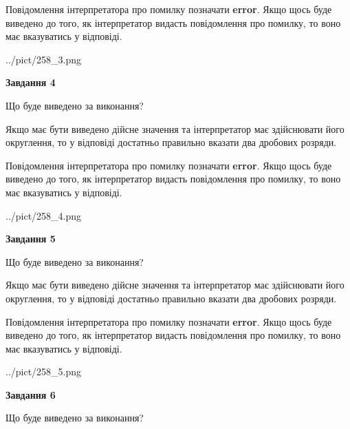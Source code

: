 \documentclass[12pt, ukrainian]{article}
\begin{document}
{\begin {Large}
Повідомлення інтерпретатора про помилку позначати \textbf{error}.
Якщо щось буде виведено до того, як інтерпретатор видасть повідомлення про помилку, 
то воно має вказуватись у відповіді. \par

\begin{center}
	{../pict/258_3.png}
\end{center}
\newpage

{\begin {center}\textbf{Завдання 4}\end {center}}\par
Що буде виведено за виконання? \par

Якщо має бути виведено дійсне значення та інтерпретатор має здійснювати його округлення, 
то у відповіді достатньо правильно вказати два дробових розряди.

Повідомлення інтерпретатора про помилку позначати \textbf{error}.
Якщо щось буде виведено до того, як інтерпретатор видасть повідомлення про помилку, 
то воно має вказуватись у відповіді. \par

\begin{center}
	{../pict/258_4.png}
\end{center}
\newpage

{\begin {center}\textbf{Завдання 5}\end {center}}\par
Що буде виведено за виконання? \par

Якщо має бути виведено дійсне значення та інтерпретатор має здійснювати його округлення, 
то у відповіді достатньо правильно вказати два дробових розряди.

Повідомлення інтерпретатора про помилку позначати \textbf{error}.
Якщо щось буде виведено до того, як інтерпретатор видасть повідомлення про помилку, 
то воно має вказуватись у відповіді. \par

\begin{center}
	{../pict/258_5.png}
\end{center}
\newpage

{\begin {center}\textbf{Завдання 6}\end {center}}\par
Що буде виведено за виконання? \par


\end{Large}}
\end{document}

